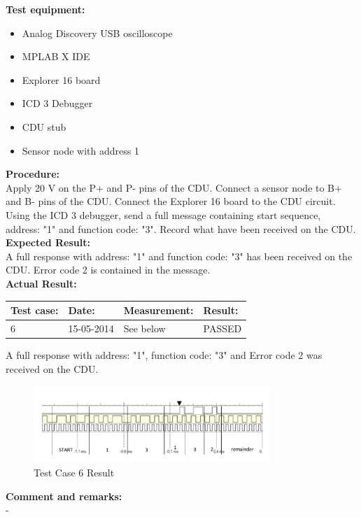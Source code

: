 \textbf{Test equipment:}
\begin{itemize}
\item Analog Discovery USB oscilloscope
\item MPLAB X IDE
\item Explorer 16 board
\item ICD 3 Debugger
\item CDU stub
\item Sensor node with address 1
\end{itemize}

\textbf{Procedure:}\\
Apply 20 V on the P+ and P- pins of the CDU. Connect a sensor node to B+ and B- pins of the CDU. Connect the Explorer 16 board to the CDU circuit. Using the ICD 3 debugger, send a full message containing start sequence, address: "1" and function code: "3". Record what have been received on the CDU.\\

\textbf{Expected Result:}\\
A full response with address: "1" and function code: "3" has been received on the CDU. Error code 2 is contained in the message.\\

\textbf{Actual Result:}\\
\begin{table}[H]
\centering
\begin{tabular}{|p{2cm}|p{2cm}|p{3cm}|p{2cm}|}\hline
\textbf{Test case:} & \textbf{Date:} & \textbf{Measurement:} & \textbf{Result:} \\ \hline
6 & 15-05-2014 & See below & PASSED \\ \hline
\end{tabular}
\end{table}
A full response with address: "1", function code: "3" and Error code 2 was received on the CDU.
\begin{figure}[H]
\centering
\includegraphics[width=0.8\textwidth]{billeder/intetestcase6}
\caption{Test Case 6 Result}
\label{fig:InteTestCase6}
\end{figure}

\textbf{Comment and remarks:}\\
-\\



